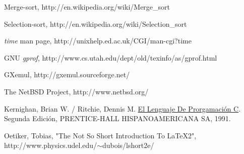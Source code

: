\documentclass[a4paper,10pt]{article}
\begin{document}
\begin{thebibliography}{99}
	

 Merge-sort, http://en.wikipedia.org/wiki/Merge\_sort

 Selection-sort, http://en.wikipedia.org/wiki/Selection\_sort

 \textit{time} man page, http://unixhelp.ed.ac.uk/CGI/man-cgi?time

 GNU \textit{gprof}, http://www.cs.utah.edu/dept/old/texinfo/as/gprof.html

 GXemul, http://gxemul.sourceforge.net/

 The NetBSD Project, http://www.netbsd.org/

 Kernighan, Brian W. / Ritchie, Dennis M. \underline{El Lenguaje De Prorgamaci\'on C}. Segunda Edici\'on, PRENTICE-HALL HISPANOAMERICANA SA, 1991.

 Oetiker, Tobias, "The Not So Short Introduction To LaTeX2", http://www.physics.udel.edu/$\sim$dubois/lshort2e/

\end{thebibliography}
\end{document}
